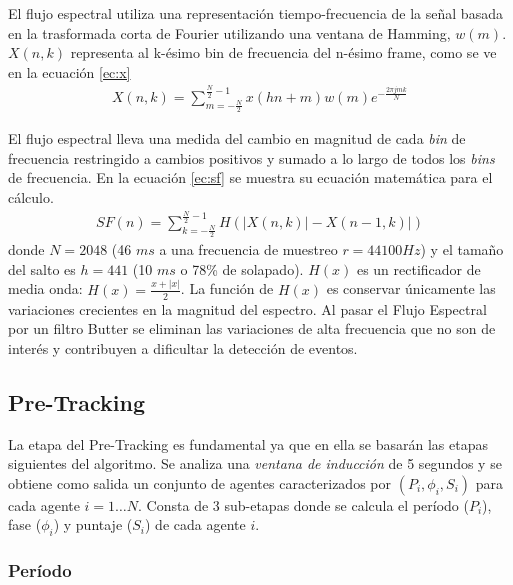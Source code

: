 \documentclass[12pt,a4paper,titlepage]{report}
\begin{document}
El flujo espectral utiliza una representación tiempo-frecuencia de la señal basada en la trasformada corta de Fourier utilizando una ventana de Hamming, $w(m)$.\\

$X(n,k)$ representa al k-ésimo bin de frecuencia del n-ésimo frame, como se ve en la ecuación \ref{ec:x}
\begin{eqnarray}
X(n,k)=\sum\limits_{m=-\frac{N}{2}}^{\frac{N}{2}-1} x(hn+m)w(m)e^{-\frac{2\pi jmk}{N}}
\label{ec:x}
\end{eqnarray}

El flujo espectral lleva una medida del cambio en magnitud de cada \emph{bin} de frecuencia restringido a cambios positivos y sumado a lo largo de todos los \emph{bins} de frecuencia. En la ecuación \ref{ec:sf} se muestra su ecuación matemática para el cálculo.
\begin{eqnarray}
SF(n)=\sum\limits_{k=-\frac{N}{2}}^{\frac{N}{2}-1} H(|X(n,k)|-X(n-1,k)|)
\label{ec:sf}
\end{eqnarray}
donde $N=2048$ (46 $ms$ a una frecuencia de muestreo $r=44100Hz$) y el tamaño del salto es $h=441$ (10 $ms$ o 78\% de solapado). $H(x)$ es un rectificador de media onda: $H(x)=\frac{x+|x|}{2}$. La función de $H(x)$ es conservar únicamente las variaciones crecientes en la magnitud del espectro. Al pasar el Flujo Espectral por un filtro Butter se eliminan las variaciones de alta frecuencia que no son de interés y contribuyen a dificultar la detección de eventos.

\subsection{Pre-Tracking}
\label{sec:pretracking}

La etapa del Pre-Tracking es fundamental ya que en ella se basarán las etapas siguientes del algoritmo. Se analiza una \emph{ventana de inducción} de 5 segundos y se obtiene como salida un conjunto de agentes caracterizados por $(P_i,\phi _i, S_i) $ para cada agente $i=1\dots N$. Consta de 3 sub-etapas donde se calcula el período ($P_i$), fase ($\phi _i$) y puntaje ($S_i$) de cada agente $i$.

\subsubsection{Período}
\end{document}
